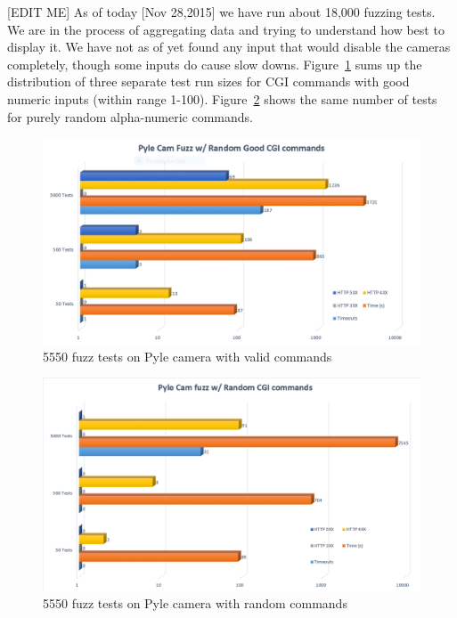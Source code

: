 \documentclass[letterpaper,twocolumn,10pt]{article}
\begin{document}
[EDIT ME]
As of today [Nov 28,2015] we have run about 18,000 fuzzing tests. We are in the process of aggregating data and trying to understand how best to display it. We have not as of yet found any input that would disable the cameras completely, though some inputs do cause slow downs. Figure~\ref{fig:Pyle_Good_CGI} sums up the distribution of three separate test run sizes for CGI commands with good numeric inputs (within range 1-100). Figure~\ref{fig:Pyle_Rand_CGI} shows the same number of tests for purely random alpha-numeric commands.
\begin{figure}
\centering
\includegraphics[width=0.9\linewidth]{Pyle_Good_CGI}
\caption{ 5550 fuzz tests on Pyle camera with valid commands}
\label{fig:Pyle_Good_CGI}
\end{figure}

\begin{figure}
\centering
\includegraphics[width=0.9\linewidth]{Pyle_Rand_CGI}
\caption{5550 fuzz tests on Pyle camera with random commands}
\label{fig:Pyle_Rand_CGI}
\end{figure}





{\footnotesize 
}
\end{document}

